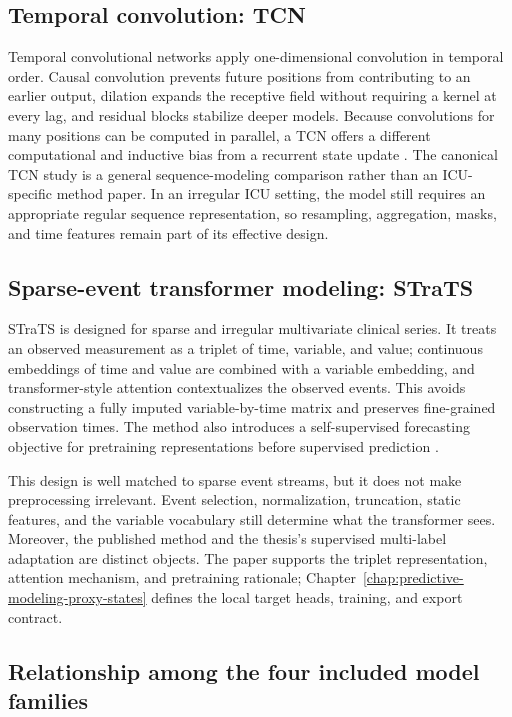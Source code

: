 \subsection{Temporal convolution: TCN}

Temporal convolutional networks apply one-dimensional convolution in temporal order.  Causal convolution prevents future positions from contributing to an earlier output, dilation expands the receptive field without requiring a kernel at every lag, and residual blocks stabilize deeper models.  Because convolutions for many positions can be computed in parallel, a TCN offers a different computational and inductive bias from a recurrent state update \cite{bai2018tcn}.  The canonical TCN study is a general sequence-modeling comparison rather than an ICU-specific method paper.  In an irregular ICU setting, the model still requires an appropriate regular sequence representation, so resampling, aggregation, masks, and time features remain part of its effective design.

\subsection{Sparse-event transformer modeling: STraTS}

STraTS is designed for sparse and irregular multivariate clinical series.  It treats an observed measurement as a triplet of time, variable, and value; continuous embeddings of time and value are combined with a variable embedding, and transformer-style attention contextualizes the observed events.  This avoids constructing a fully imputed variable-by-time matrix and preserves fine-grained observation times.  The method also introduces a self-supervised forecasting objective for pretraining representations before supervised prediction \cite{tipirneni2022strats}.

This design is well matched to sparse event streams, but it does not make preprocessing irrelevant.  Event selection, normalization, truncation, static features, and the variable vocabulary still determine what the transformer sees.  Moreover, the published method and the thesis's supervised multi-label adaptation are distinct objects.  The paper supports the triplet representation, attention mechanism, and pretraining rationale; Chapter~\ref{chap:predictive-modeling-proxy-states} defines the local target heads, training, and export contract.

\subsection{Relationship among the four included model families}


